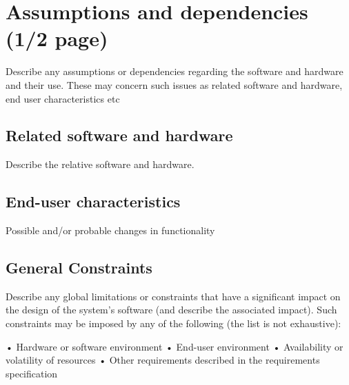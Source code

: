 \section{Assumptions and dependencies (1/2 page)}

Describe any assumptions or dependencies regarding the software and hardware and their use. These may concern such issues as related software and hardware, end user characteristics etc
\subsection{Related software and hardware}
Describe the relative software and hardware.
\subsection{End-user characteristics}
Possible and/or probable changes in functionality
\subsection{General Constraints}

Describe any global limitations or constraints that have a significant impact on the design of the system's software (and describe the associated impact). Such constraints may be imposed by any of the following (the list is not exhaustive):

    • Hardware or software environment
    • End-user environment
    • Availability or volatility of resources
    • Other requirements described in the requirements specification
